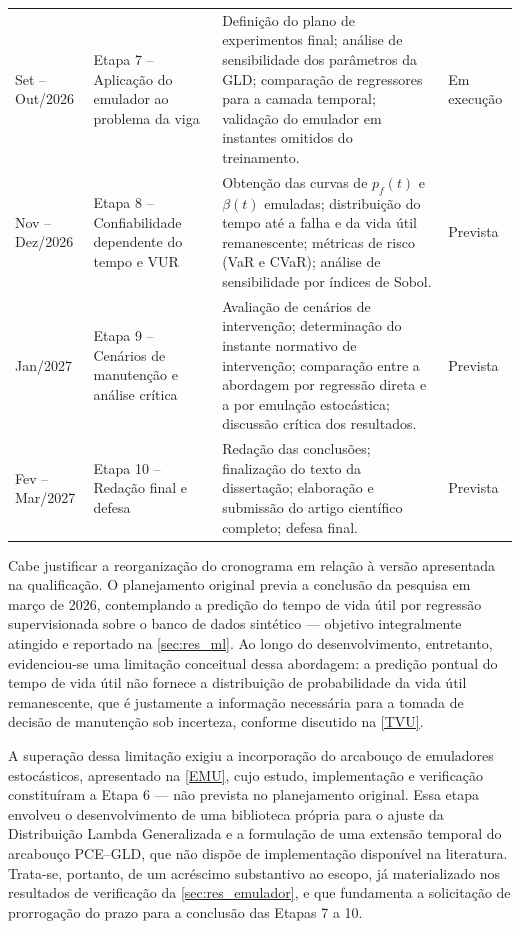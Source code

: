 \begin{table}[H]
\begin{tabular}{>{\raggedright\arraybackslash}p{2.2cm} >{\raggedright\arraybackslash}p{3.4cm} >{\raggedright\arraybackslash}p{7.2cm} >{\raggedright\arraybackslash}p{1.8cm}}
Set – Out/2026 &
Etapa 7 – Aplicação do emulador ao problema da viga &
Definição do plano de experimentos final; análise de sensibilidade dos parâmetros da GLD; comparação de regressores para a camada temporal; validação do emulador em instantes omitidos do treinamento. &
Em execução \\

Nov – Dez/2026 &
Etapa 8 – Confiabilidade dependente do tempo e VUR &
Obtenção das curvas de $p_f(t)$ e $\beta(t)$ emuladas; distribuição do tempo até a falha e da vida útil remanescente; métricas de risco (VaR e CVaR); análise de sensibilidade por índices de Sobol. &
Prevista \\

Jan/2027 &
Etapa 9 – Cenários de manutenção e análise crítica &
Avaliação de cenários de intervenção; determinação do instante normativo de intervenção; comparação entre a abordagem por regressão direta e a por emulação estocástica; discussão crítica dos resultados. &
Prevista \\

Fev – Mar/2027 &
Etapa 10 – Redação final e defesa &
Redação das conclusões; finalização do texto da dissertação; elaboração e submissão do artigo científico completo; defesa final. &
Prevista \\

\bottomrule
\end{tabular}
\vspace{0.2cm}
\end{table}

Cabe justificar a reorganização do cronograma em relação à versão apresentada na qualificação. O planejamento original previa a conclusão da pesquisa em março de 2026, contemplando a predição do tempo de vida útil por regressão supervisionada sobre o banco de dados sintético --- objetivo integralmente atingido e reportado na \autoref{sec:res_ml}. Ao longo do desenvolvimento, entretanto, evidenciou-se uma limitação conceitual dessa abordagem: a predição pontual do tempo de vida útil não fornece a distribuição de probabilidade da vida útil remanescente, que é justamente a informação necessária para a tomada de decisão de manutenção sob incerteza, conforme discutido na \autoref{TVU}.

A superação dessa limitação exigiu a incorporação do arcabouço de emuladores estocásticos, apresentado na \autoref{EMU}, cujo estudo, implementação e verificação constituíram a Etapa 6 --- não prevista no planejamento original. Essa etapa envolveu o desenvolvimento de uma biblioteca própria para o ajuste da Distribuição Lambda Generalizada e a formulação de uma extensão temporal do arcabouço PCE--GLD, que não dispõe de implementação disponível na literatura. Trata-se, portanto, de um acréscimo substantivo ao escopo, já materializado nos resultados de verificação da \autoref{sec:res_emulador}, e que fundamenta a solicitação de prorrogação do prazo para a conclusão das Etapas 7 a 10.





